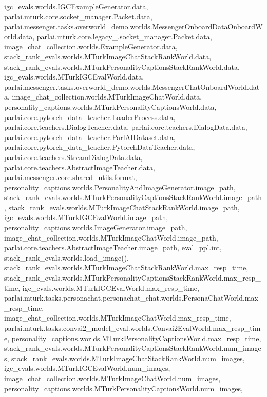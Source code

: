 igc\+\_\+evals.\+worlds.\+I\+G\+C\+Example\+Generator.\+data, parlai.\+mturk.\+core.\+socket\+\_\+manager.\+Packet.\+data, parlai.\+messenger.\+tasks.\+overworld\+\_\+demo.\+worlds.\+Messenger\+Onboard\+Data\+Onboard\+World.\+data, parlai.\+mturk.\+core.\+legacy\+\_.\+socket\+\_\+manager.\+Packet.\+data, image\+\_\+chat\+\_\+collection.\+worlds.\+Example\+Generator.\+data, stack\+\_\+rank\+\_\+evals.\+worlds.\+M\+Turk\+Image\+Chat\+Stack\+Rank\+World.\+data, stack\+\_\+rank\+\_\+evals.\+worlds.\+M\+Turk\+Personality\+Captions\+Stack\+Rank\+World.\+data, igc\+\_\+evals.\+worlds.\+M\+Turk\+I\+G\+C\+Eval\+World.\+data, parlai.\+messenger.\+tasks.\+overworld\+\_\+demo.\+worlds.\+Messenger\+Chat\+Onboard\+World.\+data, image\+\_\+chat\+\_\+collection.\+worlds.\+M\+Turk\+Image\+Chat\+World.\+data, personality\+\_\+captions.\+worlds.\+M\+Turk\+Personality\+Captions\+World.\+data, parlai.\+core.\+pytorch\+\_\+data\+\_\+teacher.\+Loader\+Process.\+data, parlai.\+core.\+teachers.\+Dialog\+Teacher.\+data, parlai.\+core.\+teachers.\+Dialog\+Data.\+data, parlai.\+core.\+pytorch\+\_\+data\+\_\+teacher.\+Parl\+A\+I\+Dataset.\+data, parlai.\+core.\+pytorch\+\_\+data\+\_\+teacher.\+Pytorch\+Data\+Teacher.\+data, parlai.\+core.\+teachers.\+Stream\+Dialog\+Data.\+data, parlai.\+core.\+teachers.\+Abstract\+Image\+Teacher.\+data, parlai.\+messenger.\+core.\+shared\+\_\+utils.\+format, personality\+\_\+captions.\+worlds.\+Personality\+And\+Image\+Generator.\+image\+\_\+path, stack\+\_\+rank\+\_\+evals.\+worlds.\+M\+Turk\+Personality\+Captions\+Stack\+Rank\+World.\+image\+\_\+path, stack\+\_\+rank\+\_\+evals.\+worlds.\+M\+Turk\+Image\+Chat\+Stack\+Rank\+World.\+image\+\_\+path, igc\+\_\+evals.\+worlds.\+M\+Turk\+I\+G\+C\+Eval\+World.\+image\+\_\+path, personality\+\_\+captions.\+worlds.\+Image\+Generator.\+image\+\_\+path, image\+\_\+chat\+\_\+collection.\+worlds.\+M\+Turk\+Image\+Chat\+World.\+image\+\_\+path, parlai.\+core.\+teachers.\+Abstract\+Image\+Teacher.\+image\+\_\+path, eval\+\_\+ppl.\+int, stack\+\_\+rank\+\_\+evals.\+worlds.\+load\+\_\+image(), stack\+\_\+rank\+\_\+evals.\+worlds.\+M\+Turk\+Image\+Chat\+Stack\+Rank\+World.\+max\+\_\+resp\+\_\+time, stack\+\_\+rank\+\_\+evals.\+worlds.\+M\+Turk\+Personality\+Captions\+Stack\+Rank\+World.\+max\+\_\+resp\+\_\+time, igc\+\_\+evals.\+worlds.\+M\+Turk\+I\+G\+C\+Eval\+World.\+max\+\_\+resp\+\_\+time, parlai.\+mturk.\+tasks.\+personachat.\+personachat\+\_\+chat.\+worlds.\+Persona\+Chat\+World.\+max\+\_\+resp\+\_\+time, image\+\_\+chat\+\_\+collection.\+worlds.\+M\+Turk\+Image\+Chat\+World.\+max\+\_\+resp\+\_\+time, parlai.\+mturk.\+tasks.\+convai2\+\_\+model\+\_\+eval.\+worlds.\+Convai2\+Eval\+World.\+max\+\_\+resp\+\_\+time, personality\+\_\+captions.\+worlds.\+M\+Turk\+Personality\+Captions\+World.\+max\+\_\+resp\+\_\+time, stack\+\_\+rank\+\_\+evals.\+worlds.\+M\+Turk\+Personality\+Captions\+Stack\+Rank\+World.\+num\+\_\+images, stack\+\_\+rank\+\_\+evals.\+worlds.\+M\+Turk\+Image\+Chat\+Stack\+Rank\+World.\+num\+\_\+images, igc\+\_\+evals.\+worlds.\+M\+Turk\+I\+G\+C\+Eval\+World.\+num\+\_\+images, image\+\_\+chat\+\_\+collection.\+worlds.\+M\+Turk\+Image\+Chat\+World.\+num\+\_\+images, personality\+\_\+captions.\+worlds.\+M\+Turk\+Personality\+Captions\+World.\+num\+\_\+images, 